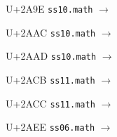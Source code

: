 \documentclass{article}
\begin{document}
\begin{substitutions}
\goodbreak

U+2A9E  \linebreak
    \texttt{ss10.math} $\to$  

\goodbreak

U+2AAC  \linebreak
    \texttt{ss10.math} $\to$  

\goodbreak

U+2AAD  \linebreak
    \texttt{ss10.math} $\to$  

\goodbreak

U+2ACB  \linebreak
    \texttt{ss11.math} $\to$  

\goodbreak

U+2ACC  \linebreak
    \texttt{ss11.math} $\to$  

\goodbreak

U+2AEE  \linebreak
    \texttt{ss06.math} $\to$  

\goodbreak

\end{substitutions}

\clearpage
\end{document}
